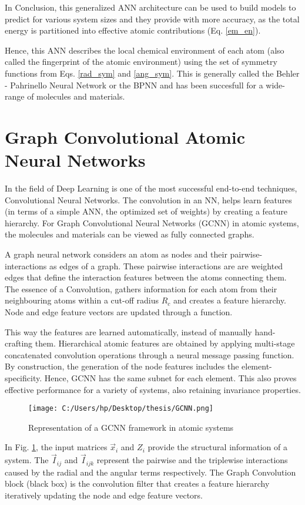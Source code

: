 \documentclass[11pt,a4paper]{report}
\begin{document}
{In Conclusion, this generalized ANN architecture can be used to build models to predict for various system sizes and they provide with more accuracy, as the total energy is partitioned into effective atomic contributions\cite{BPNN} (Eq. \ref{em_en}). 

Hence, this ANN describes the local chemical environment of each atom (also called the fingerprint of the atomic environment\cite{atmfing}) using the set of symmetry functions from Eqs. \ref{rad_sym} and \ref{ang_sym}. This is generally called the Behler - Pahrinello Neural Network or the BPNN and has been succesfull for a wide-range of molecules and materials.

\section{Graph Convolutional Atomic Neural Networks}
In the field of Deep Learning is one of the most successful end-to-end techniques, Convolutional Neural Networks. The convolution in an NN, helps learn features (in terms of a simple ANN, the optimized set of weights) by creating a feature hierarchy.  For Graph Convolutional Neural Networks (GCNN) in atomic systems, the molecules and materials can be viewed as fully connected graphs\cite{GCNN}.

 A graph neural network considers an atom as nodes and their pairwise-interactions as edges of a graph. These pairwise interactions are are weighted edges that define the interaction features between the atoms connecting them. The essence of a Convolution, gathers information for each atom from their neighbouring atoms within a cut-off radius $R_c$ and creates a feature hierarchy. Node and edge feature vectors are updated through a function. 

This way the features are learned automatically, instead of manually hand-crafting them. Hierarchical atomic features\cite{fthier} are obtained by applying multi-stage concatenated convolution operations through a neural message passing function. By construction, the generation of the node features includes the element-specificity. Hence, GCNN has the same subnet for each element. This also proves effective performance for a variety of systems, also retaining invariance properties.
\begin{figure} [H]
\centering
\texttt{[image: C:/Users/hp/Desktop/thesis/GCNN.png]}
\caption{Representation of a GCNN framework in atomic systems}
\label{GCNN}
\end{figure}
In Fig. \ref{GCNN}, the input matrices $\vec{x}_i$ and $Z_i$ provide the structural information of a system. The $\vec{I}_{ij}$ and $\vec{I}_{ijk}$ represent the pairwise and the triplewise interactions caused by the radial and the angular terms respectively. The Graph Convolution block (black box) is the convolution filter that creates a feature hierarchy iteratively updating the node and edge feature vectors.

}
\end{document}
